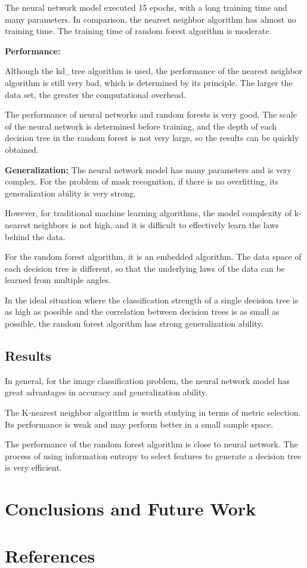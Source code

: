 \documentclass{article}
\begin{document}
  The neural network model executed 15 epochs, with a long training time and many parameters. In comparison, the nearest neighbor algorithm has almost no training time. The training time of random forest algorithm is moderate.

  \textbf{Performance:}

  Although the kd\_tree algorithm is used, the performance of the nearest neighbor algorithm is still very bad, which is determined by its principle. The larger the data set, the greater the computational overhead.

  The performance of neural networks and random forests is very good. The scale of the neural network is determined before training, and the depth of each decision tree in the random forest is not very large, so the results can be quickly obtained.

  \textbf{Generalization:}
  The neural network model has many parameters and is very complex. For the problem of mask recognition, if there is no overfitting, its generalization ability is very strong.

  However, for traditional machine learning algorithms, the model complexity of k-nearest neighbors is not high, and it is difficult to effectively learn the laws behind the data.

  For the random forest algorithm, it is an embedded algorithm. The data space of each decision tree is different, so that the underlying laws of the data can be learned from multiple angles.
  
  In the ideal situation where the classification strength of a single decision tree is as high as possible and the correlation between decision trees is as small as possible, the random forest algorithm has strong generalization ability.
  \subsection{Results}
  In general, for the image classification problem, the neural network model has great advantages in accuracy and generalization ability.

  The K-nearest neighbor algorithm is worth studying in terms of metric selection. Its performance is weak and may perform better in a small sample space.

  The performance of the random forest algorithm is close to neural network. The process of using information entropy to select features to generate a decision tree is very efficient.

\section{Conclusions and Future Work}


\section{References}
\end{document}
